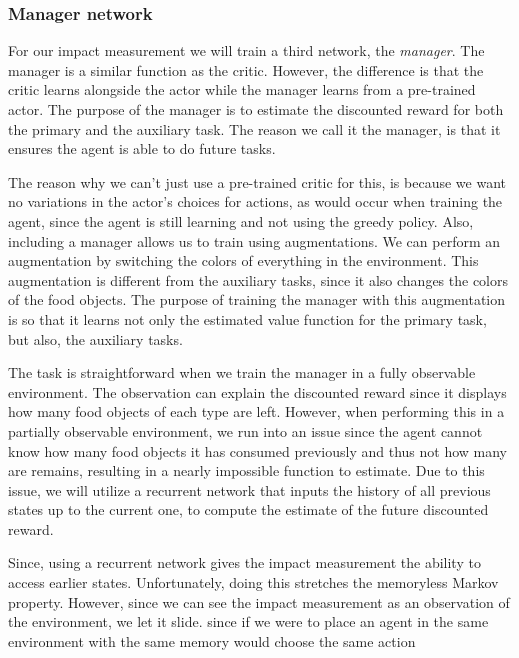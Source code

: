 \documentclass[12pt,A4]{report}
\theoremstyle{definition}
\begin{document}
\subsubsection{Manager network}

For our impact measurement we will train a third network, the \textit{manager}. The manager is a similar function as the critic. However, the difference is that the critic learns alongside the actor while the manager learns from a pre-trained actor. The purpose of the manager is to estimate the discounted reward for both the primary and the auxiliary task. The reason we call it the manager, is that it ensures the agent is able to do future tasks.

The reason why we can't just use a pre-trained critic for this, is because we want no variations in the actor's choices for actions, as would occur when training the agent, since the agent is still learning and not using the greedy policy. Also, including a manager allows us to train using augmentations. We can perform an augmentation by switching the colors of everything in the environment. This augmentation is different from the auxiliary tasks, since it also changes the colors of the food objects. The purpose of training the manager with this augmentation is so that it learns not only the estimated value function for the primary task, but also, the auxiliary tasks. 

The task is straightforward when we train the manager in a fully observable environment. The observation can explain the discounted reward since it displays how many food objects of each type are left. However, when performing this in a partially observable environment, we run into an issue since the agent cannot know how many food objects it has consumed previously and thus not how many are remains, resulting in a nearly impossible function to estimate. Due to this issue, we will utilize a recurrent network that inputs the history of all previous states up to the current one, to compute the estimate of the future discounted reward. 

Since, using a recurrent network gives the impact measurement the ability to access earlier states. Unfortunately, doing this stretches the memoryless Markov property. However, since we can see the impact measurement as an observation of the environment, we let it slide. since if we were to place an agent in the same environment with the same memory would choose the same action
\end{document}
